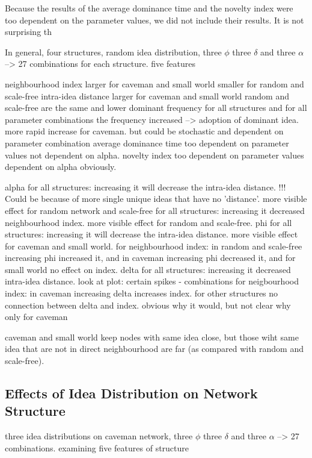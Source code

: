 Because the results of the average dominance time and the novelty index were too dependent on the parameter values, we did not include their results. It is not surprising th

In general,   
four structures, random idea distribution, three $\phi$ three $\delta$ and three $\alpha$ --> 27 combinations for each structure. five features

neighbourhood index
	larger for caveman and small world
	smaller for random and scale-free
intra-idea distance
	larger for caveman and small world
	random and scale-free are the same and lower
dominant frequency
	for all structures and for all parameter combinations the frequency increased --> adoption of dominant idea.
	more rapid increase for caveman. but could be stochastic and dependent on parameter combination
average dominance time
	too dependent on parameter values
	not dependent on alpha.
novelty index
	too dependent on parameter values
	dependent on alpha obviously.

alpha
	for all structures: increasing it will decrease the intra-idea distance. !!! Could be because of more single unique ideas that have no 'distance'. more visible effect for random network and scale-free
	for all structures: increasing it decreased neighbourhood index. more visible effect for random and scale-free.
phi
	for all structures: increasing it will decrease the intra-idea distance. more visible effect for caveman and small world.
	for neighbourhood index: in random and scale-free increasing phi increased it, and in caveman increasing phi decreased it, and for small world no effect on index.
delta
	for all structures: increasing it decreased intra-idea distance. look at plot: certain spikes - combinations
	for neigbourhood index: in caveman increasing delta increases index. for other structures no connection between delta and index. obvious why it would, but not clear why only for caveman

caveman and small world keep nodes with same idea close, but those wiht same idea that are not in direct neighbourhood are far (as compared with random and scale-free).





\subsection{Effects of Idea Distribution on Network Structure}

three idea distributions on caveman network, three $\phi$ three $\delta$ and three $\alpha$ --> 27 combinations. examining five features of structure

